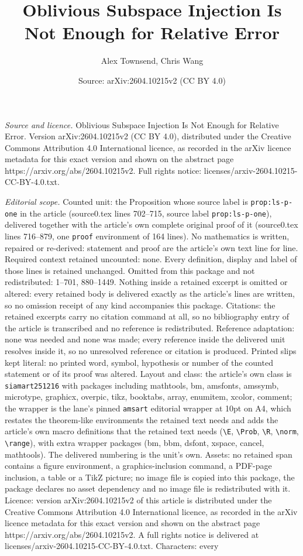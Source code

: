 \documentclass[10pt,a4paper]{amsart}
\title[Oblivious Subspace Injection Is Not Enough for Relative Erro]{Oblivious Subspace Injection Is Not Enough for Relative Error}
\author{Alex Townsend, Chris Wang}
\date{Source: arXiv:2604.10215v2 (CC BY 4.0)}
\begin{document}
\maketitle

\noindent\emph{Source and licence.} Oblivious Subspace Injection Is Not Enough for Relative Error. Version arXiv:2604.10215v2 (CC BY 4.0), distributed under the Creative Commons Attribution 4.0 International licence, as recorded in the arXiv licence metadata for this exact version and shown on the abstract page https://arxiv.org/abs/2604.10215v2. Full rights notice: licenses/arxiv-2604.10215-CC-BY-4.0.txt.\par\smallskip

\noindent\textit{Editorial scope.} Counted unit: the Proposition whose source label is \texttt{prop:ls-p-one} in the article (source0.tex lines 702--715, source label \texttt{prop:ls-p-one}), delivered together with the article's own complete original proof of it (source0.tex lines 716--879, one \texttt{proof} environment of 164 lines). No mathematics is written, repaired or re-derived: statement and proof are the article's own text line for line. Required context retained uncounted: none. Every definition, display and label of those lines is retained unchanged. Omitted from this package and not redistributed: 1--701, 880--1449. Nothing inside a retained excerpt is omitted or altered: every retained body is delivered exactly as the article's lines are written, so no omission receipt of any kind accompanies this package. Citations: the retained excerpts carry no citation command at all, so no bibliography entry of the article is transcribed and no reference is redistributed. Reference adaptation: none was needed and none was made; every reference inside the delivered unit resolves inside it, so no unresolved reference or citation is produced. Printed slips kept literal: no printed word, symbol, hypothesis or number of the counted statement or of its proof was altered. Layout and class: the article's own class is \texttt{siamart251216} with packages including mathtools, bm, amsfonts, amssymb, microtype, graphicx, overpic, tikz, booktabs, array, enumitem, xcolor, comment; the wrapper is the lane's pinned \texttt{amsart} editorial wrapper at 10pt on A4, which restates the theorem-like environments the retained text needs and adds the article's own macro definitions that the retained text needs (\texttt{\textbackslash E}, \texttt{\textbackslash Prob}, \texttt{\textbackslash R}, \texttt{\textbackslash norm}, \texttt{\textbackslash range}), with extra wrapper packages (bm, bbm, dsfont, xspace, cancel, mathtools). The delivered numbering is the unit's own. Assets: no retained span contains a figure environment, a graphics-inclusion command, a PDF-page inclusion, a table or a TikZ picture; no image file is copied into this package, the package declares no asset dependency and no image file is redistributed with it. Licence: version arXiv:2604.10215v2 of this article is distributed under the Creative Commons Attribution 4.0 International licence, as recorded in the arXiv licence metadata for this exact version and shown on the abstract page https://arxiv.org/abs/2604.10215v2. A full rights notice is delivered at licenses/arxiv-2604.10215-CC-BY-4.0.txt. Characters: every 
\end{document}

